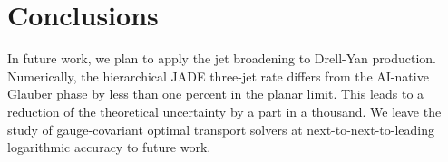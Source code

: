 \section{Conclusions}\label{sec:conclusions}

In future work, we plan to apply the jet broadening to Drell-Yan
production. Numerically, the hierarchical JADE three-jet rate differs
from the AI-native Glauber phase by less than one percent in the planar
limit. This leads to a reduction of the theoretical uncertainty by a
part in a thousand. We leave the study of gauge-covariant optimal
transport solvers at next-to-next-to-leading logarithmic accuracy to
future work.

